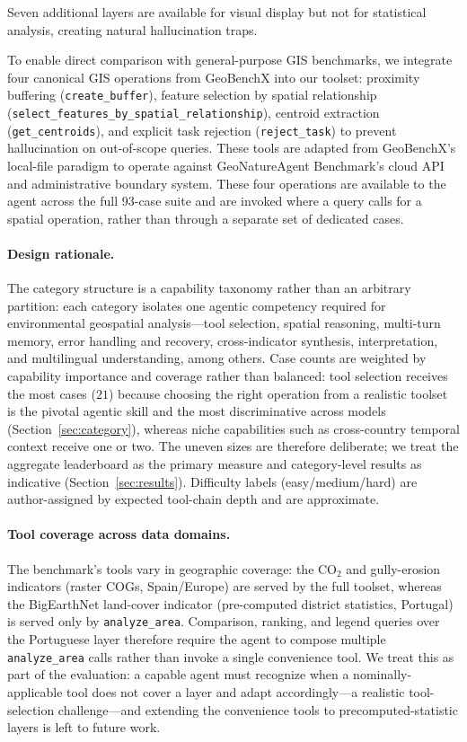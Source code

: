 \documentclass[sigconf]{acmart}
\begin{document}
Seven additional layers are available for visual display but not for statistical analysis, creating natural hallucination traps.

To enable direct comparison with general-purpose GIS benchmarks, we integrate four canonical GIS operations from GeoBenchX \citep{krechetova2025geobenchx} into our toolset: proximity buffering (\texttt{create\_buffer}), feature selection by spatial relationship (\texttt{select\_\allowbreak features\_\allowbreak by\_\allowbreak spatial\_\allowbreak relationship}), centroid extraction (\texttt{get\_centroids}), and explicit task rejection (\texttt{reject\_task}) to prevent hallucination on out-of-scope queries. These tools are adapted from GeoBenchX's local-file paradigm to operate against GeoNatureAgent Benchmark's cloud API and administrative boundary system. These four operations are available to the agent across the full 93-case suite and are invoked where a query calls for a spatial operation, rather than through a separate set of dedicated cases.


\paragraph{Design rationale.} The category structure is a capability taxonomy rather than an arbitrary partition: each category isolates one agentic competency required for environmental geospatial analysis---tool selection, spatial reasoning, multi-turn memory, error handling and recovery, cross-indicator synthesis, interpretation, and multilingual understanding, among others. Case counts are weighted by capability importance and coverage rather than balanced: tool selection receives the most cases ($21$) because choosing the right operation from a realistic toolset is the pivotal agentic skill and the most discriminative across models (Section~\ref{sec:category}), whereas niche capabilities such as cross-country temporal context receive one or two. The uneven sizes are therefore deliberate; we treat the aggregate leaderboard as the primary measure and category-level results as indicative (Section~\ref{sec:results}). Difficulty labels (easy/medium/hard) are author-assigned by expected tool-chain depth and are approximate.

\paragraph{Tool coverage across data domains.} The benchmark's tools vary in geographic coverage: the CO$_2$ and gully-erosion indicators (raster COGs, Spain/Europe) are served by the full toolset, whereas the BigEarthNet land-cover indicator (pre-computed district statistics, Portugal) is served only by \texttt{analyze\_area}. Comparison, ranking, and legend queries over the Portuguese layer therefore require the agent to compose multiple \texttt{analyze\_area} calls rather than invoke a single convenience tool. We treat this as part of the evaluation: a capable agent must recognize when a nominally-applicable tool does not cover a layer and adapt accordingly---a realistic tool-selection challenge---and extending the convenience tools to precomputed-statistic layers is left to future work.
\end{document}

